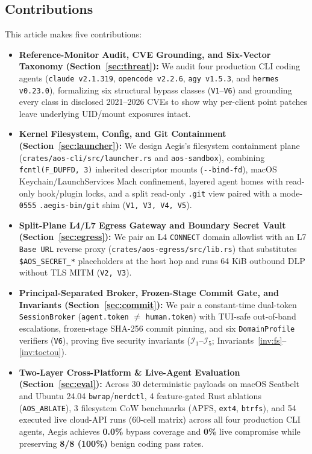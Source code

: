 \documentclass[10pt,journal,compsoc]{IEEEtran}
\begin{document}
\subsection{Contributions}

This article makes five contributions:
\begin{itemize}
    \item \textbf{Reference-Monitor Audit, CVE Grounding, and Six-Vector Taxonomy (Section~\ref{sec:threat}):} We audit four production CLI coding agents (\texttt{claude v2.1.319}, \texttt{opencode v2.2.6}, \texttt{agy v1.5.3}, and \texttt{hermes v0.23.0}), formalizing six structural bypass classes (\texttt{V1}--\texttt{V6}) and grounding every class in disclosed 2021--2026 CVEs to show why per-client point patches leave underlying UID/mount exposures intact.
    \item \textbf{Kernel Filesystem, Config, and Git Containment (Section~\ref{sec:launcher}):} We design Aegis's filesystem containment plane (\texttt{crates/\allowbreak aos-cli/\allowbreak src/\allowbreak launcher.rs} and \texttt{aos-sandbox}), combining \texttt{fcntl(F\_DUPFD, 3)} inherited descriptor mounts (\texttt{-\/-bind-fd}), macOS Keychain/LaunchServices Mach confinement, layered agent homes with read-only hook/plugin locks, and a split read-only \texttt{.git} view paired with a mode-\texttt{0555} \texttt{.aegis-bin/git} shim (\texttt{V1, V3, V4, V5}).
    \item \textbf{Split-Plane L4/L7 Egress Gateway and Boundary Secret Vault (Section~\ref{sec:egress}):} We pair an L4 \texttt{CONNECT} domain allowlist with an L7 \texttt{Base URL} reverse proxy (\texttt{crates/aos-egress/src/lib.rs}) that substitutes \texttt{\$AOS\_SECRET\_*} placeholders at the host hop and runs 64 KiB outbound DLP without TLS MITM (\texttt{V2, V3}).
    \item \textbf{Principal-Separated Broker, Frozen-Stage Commit Gate, and Invariants (Section~\ref{sec:commit}):} We pair a constant-time dual-token \texttt{SessionBroker} (\texttt{agent.token} $\neq$ \texttt{human.token}) with TUI-safe out-of-band escalations, frozen-stage SHA-256 commit pinning, and six \texttt{DomainProfile} verifiers (\texttt{V6}), proving five security invariants ($\mathcal{I}_1$--$\mathcal{I}_5$; Invariants~\ref{inv:fs}--\ref{inv:toctou}).
    \item \textbf{Two-Layer Cross-Platform \& Live-Agent Evaluation (Section~\ref{sec:eval}):} Across 30 deterministic payloads on macOS Seatbelt and Ubuntu 24.04 \texttt{bwrap}/\texttt{nerdctl}, 4 feature-gated Rust ablations (\texttt{AOS\_ABLATE}), 3 filesystem CoW benchmarks (APFS, \texttt{ext4}, \texttt{btrfs}), and 54 executed live cloud-API runs (60-cell matrix) across all four production CLI agents, Aegis achieves \textbf{0.0\%} bypass coverage and \textbf{0\%} live compromise while preserving \textbf{8/8 (100\%)} benign coding pass rates.
\end{itemize}
\end{document}
